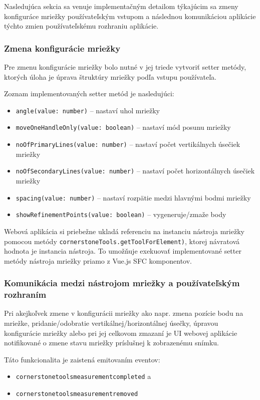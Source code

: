 Nasledujúca sekcia sa venuje implementačným detailom týkajúcim sa zmeny konfiguráce mriežky používateľským vstupom a následnou komunikáciou aplikácie týchto zmien používateľskému rozhraniu aplikácie.

\subsubsection {Zmena konfigurácie mriežky}
Pre zmenu konfigurácie mriežky bolo nutné v jej triede vytvoriť setter metódy, ktorých úloha je úprava štruktúry mriežky podľa vstupu používateľa.

Zoznam implementovaných setter metód je nasledujúci:
\begin {itemize}
\item {\texttt{angle(value: number)} -- nastaví uhol mriežky}
\item {\texttt{moveOneHandleOnly(value: boolean)} -- nastaví mód posunu mriežky}
\item {\texttt{noOfPrimaryLines(value: number)} -- nastaví počet vertikálnych úsečiek mriežky}
\item {\texttt{noOfSecondaryLines(value: number)} -- nastaví počet horizontálnych úsečiek mriežky}
\item {\texttt{spacing(value: number)} -- nastaví rozpätie medzi hlavnými bodmi mriežky}
\item {\texttt{showRefinementPoints(value: boolean)} -- vygeneruje/zmaže  body}
\end {itemize}

\clearpage

Webová aplikácia si priebežne ukladá referenciu na instanciu nástroja mriežky pomocou metódy \texttt{cornerstoneTools.getToolForElement)}, ktorej návratová hodnota je instancia nástroja. To umožňuje exekuovať implementované setter metódy nástroja mriežky priamo z Vue.js SFC komponentov.

\subsubsection {Komunikácia medzi nástrojom mriežky a používateľským rozhraním}
Pri akejkoľvek zmene v konfigurácii mriežky ako napr. zmena pozície bodu na mriežke, pridanie/odobratie vertikálnej/horizontálnej úsečky, úpravou konfigurácie mriežky alebo pri jej celkovom zmazaní je UI webovej aplikácie notifikované o zmene stavu mriežky príslušnej k zobrazenému snímku.

Táto funkcionalita je zaistená emitovaním eventov:
\begin {itemize}
\item {\texttt{cornerstonetoolsmeasurementcompleted} a}
\item {\texttt{cornerstonetoolsmeasurementremoved}}
\end {itemize}

